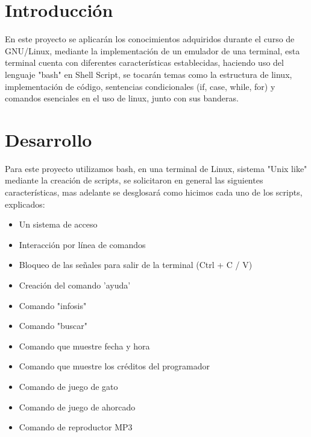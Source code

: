 \documentclass[letterpaper,12pt]{article} %
\begin{document}
\lstset{language=bash} 
    
    \tableofcontents
    \newpage

\section{Introducción}

En este proyecto se aplicarán los conocimientos adquiridos durante el curso de GNU/Linux, mediante la implementación de un emulador de una terminal, esta terminal cuenta con diferentes características establecidas, haciendo uso del lenguaje "bash" en Shell Script, se tocarán temas como la estructura de linux, implementación de código, sentencias condicionales (if, case, while, for) y comandos esenciales en el uso de linux, junto con sus banderas.

\section{Desarrollo}

Para este proyecto utilizamos bash, en una terminal de Linux, sistema "Unix like" mediante la creación de scripts, se solicitaron en general las siguientes características, mas adelante se desglosará como hicimos cada uno de los scripts, explicados:
\begin{itemize}
    \item Un sistema de acceso
    \item Interacción por línea de comandos
    \item Bloqueo de las señales para salir de la terminal (Ctrl + C / V)
    \item Creación del comando 'ayuda'
    \item Comando "infosis"
    \item Comando "buscar"
    \item Comando que muestre fecha y hora
    \item Comando que muestre los créditos del programador
    \item Comando de juego de gato
    \item Comando de juego de ahorcado
    \item Comando de reproductor MP3
    \end{itemize}
\end{document}
